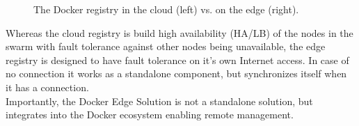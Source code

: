\begin{figure}[h!]
    \centering
    \noindent{}
    \caption{The Docker registry in the cloud (left) vs. on the edge (right).}
    \label{fig:dockerRegistryForIoT}
\end{figure}
Whereas the cloud registry is build high availability (HA/LB) of the nodes in the swarm with fault tolerance against other nodes being unavailable, the edge registry is designed to have fault tolerance on it's own Internet access. In case of no connection it works as a standalone component, but synchronizes itself when it has a connection.\\
Importantly, the Docker Edge Solution is not a standalone solution, but integrates into the Docker ecosystem enabling remote management.

